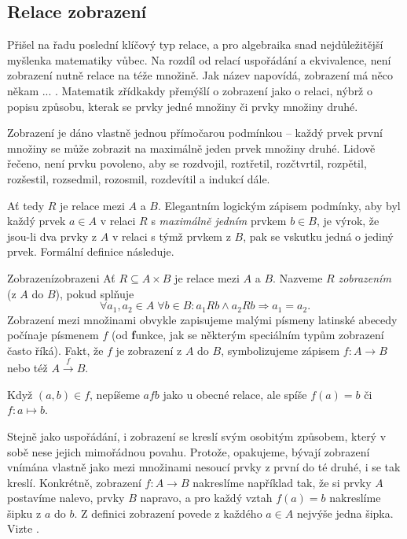 \subsection{Relace zobrazení}
\label{ssec:relace-zobrazeni}

Přišel na řadu poslední klíčový typ relace, a pro algebraika snad nejdůležitější
myšlenka matematiky vůbec. Na rozdíl od relací uspořádání a ekvivalence, není
zobrazení nutně relace na téže množině. Jak název napovídá, zobrazení má něco
někam ... . Matematik zřídkakdy přemýšlí o zobrazení jako o
relaci, nýbrž o popisu způsobu, kterak se prvky jedné množiny 
či  prvky množiny druhé.

Zobrazení je dáno vlastně jednou přímočarou podmínkou -- každý prvek první
množiny se může zobrazit na maximálně jeden prvek množiny druhé. Lidově řečeno,
není prvku povoleno, aby se rozdvojil, roztřetil, rozčtvrtil, rozpětil,
rozšestil, rozsedmil, rozosmil, rozdevítil a indukcí dále.

Ať tedy $R$ je relace mezi $A$ a $B$. Elegantním logickým zápisem podmínky, aby
byl každý prvek $a \in A$ v relaci $R$ s \emph{maximálně jedním} prvkem $b \in
B$, je výrok, že jsou-li dva prvky z $A$ v relaci s týmž prvkem z $B$, pak se
vskutku jedná o jediný prvek. Formální definice následuje.

\begin{definition}{Zobrazení}{zobrazeni}
 Ať $R \subseteq A \times B$ je relace mezi $A$ a $B$. Nazveme $R$
 \emph{zobrazením} (z $A$ do $B$), pokud splňuje
 \[
  \forall a_1,a_2 \in A \; \forall b \in B: a_1Rb \wedge a_2Rb \Rightarrow a_1 =
  a_2.
 \]
 Zobrazení mezi množinami obvykle zapisujeme malými písmeny latinské abecedy
 počínaje písmenem $f$ (od \textbf{f}unkce, jak se některým speciálním typům
 zobrazení často říká). Fakt, že $f$ je zobrazení z $A$ do $B$, symbolizujeme
 zápisem $f:A \to B$ nebo též $A \overset{f}{ \longrightarrow } B$.

 Když $(a,b) \in f$, nepíšeme $afb$ jako u obecné relace, ale spíše $f(a) = b$
 či $f:a \mapsto b$.
\end{definition}

Stejně jako uspořádání, i zobrazení se kreslí svým osobitým způsobem, který v
sobě nese jejich mimořádnou povahu. Protože, opakujeme, bývají zobrazení vnímána
vlastně jako  mezi množinami nesoucí prvky z první do té druhé, i se
tak kreslí. Konkrétně, zobrazení $f:A \to B$ nakreslíme například tak, že si
prvky $A$ postavíme nalevo, prvky $B$ napravo, a pro každý vztah $f(a) = b$
nakreslíme šipku z $a$ do $b$. Z definici zobrazení povede z každého $a \in A$
nejvýše jedna šipka. Vizte .


